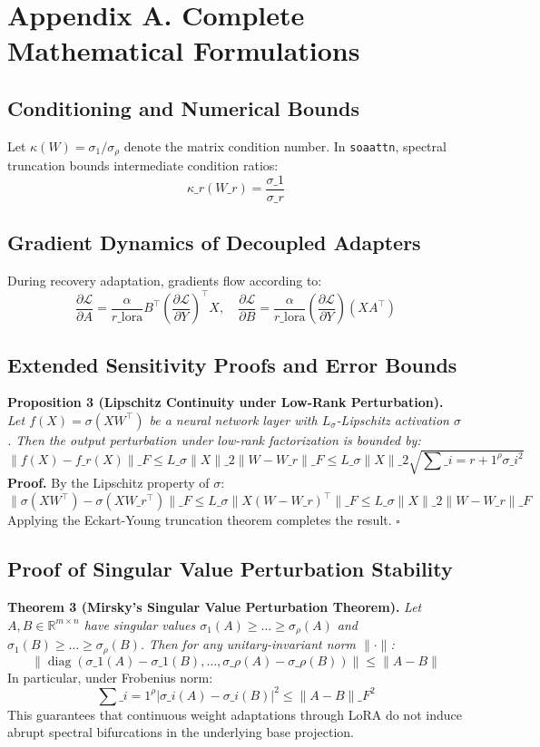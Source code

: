 \section*{Appendix A. Complete Mathematical Formulations}

\subsection*{Conditioning and Numerical Bounds}
Let $\kappa(W) = \sigma_1 / \sigma_\rho$ denote the matrix condition number. In \texttt{soaattn}, spectral truncation bounds intermediate condition ratios:
\[
\kappa\_r(W\_r) = \frac{\sigma\_1}{\sigma\_r}
\]

\subsection*{Gradient Dynamics of Decoupled Adapters}
During recovery adaptation, gradients flow according to:
\[
\frac{\partial \mathcal{L}}{\partial A} = \frac{\alpha}{r\_{\text{lora}}} B^\top \left( \frac{\partial \mathcal{L}}{\partial Y} \right)^\top X, \quad \frac{\partial \mathcal{L}}{\partial B} = \frac{\alpha}{r\_{\text{lora}}} \left( \frac{\partial \mathcal{L}}{\partial Y} \right) (X A^\top)
\]

\subsection*{Extended Sensitivity Proofs and Error Bounds}
\textbf{Proposition 3 (Lipschitz Continuity under Low-Rank Perturbation).} \textit{Let $f(X) = \sigma(X W^\top)$ be a neural network layer with $L_\sigma$-Lipschitz activation $\sigma$. Then the output perturbation under low-rank factorization is bounded by:}
\[
\|f(X) - f\_r(X)\|\_F \le L\_\sigma \|X\|\_2 \|W - W\_r\|\_F \le L\_\sigma \|X\|\_2 \sqrt{\sum\_{i=r+1}^\rho \sigma\_i^2}
\]
\textbf{Proof.} By the Lipschitz property of $\sigma$:
\[
\|\sigma(X W^\top) - \sigma(X W\_r^\top)\|\_F \le L\_\sigma \|X (W - W\_r)^\top\|\_F \le L\_\sigma \|X\|\_2 \|W - W\_r\|\_F
\]
Applying the Eckart-Young truncation theorem completes the result. $\square$

\subsection*{Proof of Singular Value Perturbation Stability}
\textbf{Theorem 3 (Mirsky's Singular Value Perturbation Theorem).} \textit{Let $A, B \in \mathbb{R}^{m \times n}$ have singular values $\sigma_1(A) \ge \dots \ge \sigma_\rho(A)$ and $\sigma_1(B) \ge \dots \ge \sigma_\rho(B)$. Then for any unitary-invariant norm $\|\cdot\|$:}
\[
\left\| \operatorname{diag}(\sigma\_1(A) - \sigma\_1(B), \dots, \sigma\_\rho(A) - \sigma\_\rho(B)) \right\| \le \|A - B\|
\]
In particular, under Frobenius norm:
\[
\sum\_{i=1}^\rho |\sigma\_i(A) - \sigma\_i(B)|^2 \le \|A - B\|\_F^2
\]
This guarantees that continuous weight adaptations through LoRA do not induce abrupt spectral bifurcations in the underlying base projection.

